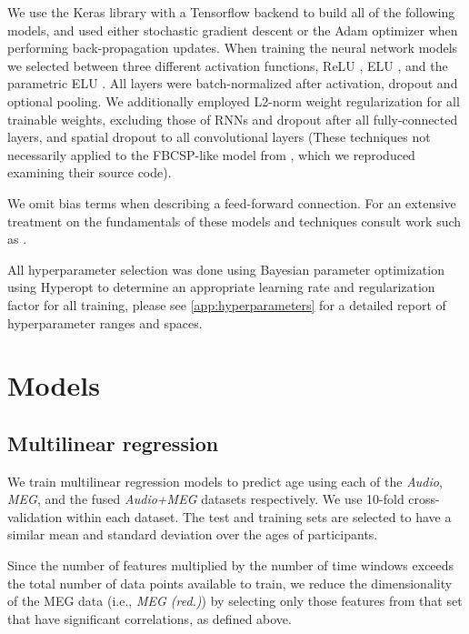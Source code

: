 \documentclass[utf8]{frontiersSCNS} %
\begin{document}
We use the Keras library \cite{} with a Tensorflow \cite{} backend to build all of the following models, and used either stochastic gradient descent or the Adam optimizer \cite{} when performing back-propagation updates. When training the neural network models we selected between three different activation functions, ReLU \cite{}, ELU \cite{}, and the parametric ELU \cite{}. All layers were batch-normalized \cite{Szegedy2015} after activation, dropout and optional pooling. We additionally employed L2-norm weight regularization for all trainable weights, excluding those of RNNs and dropout \cite{} after all fully-connected layers, and spatial dropout \cite{} to all convolutional layers (These techniques not necessarily applied to the FBCSP-like model from \cite{Schirrmeister2017}, which we reproduced examining their source code).

We omit bias terms when describing a feed-forward connection. For an extensive treatment on the fundamentals of these models and techniques consult work such as \cite{GoodfellowTextbook}.

All hyperparameter selection was done using Bayesian parameter optimization using Hyperopt \cite{Bergstra2013} to determine an appropriate learning rate and regularization factor for all training, please see \ref{app:hyperparameters} for a detailed report of hyperparameter ranges and spaces.

\section{Models}

\subsection{Multilinear regression}

We train multilinear regression models to predict age using each of the \textit{Audio}, \textit{MEG}, and the fused \textit{Audio+MEG} datasets respectively. We use 10-fold cross-validation within each dataset. The test and training sets are selected to have a similar mean and standard deviation over the ages of participants. 

Since the number of features multiplied by the number of time windows exceeds the total number of data points available to train, we reduce the dimensionality of the MEG data (i.e., {\em MEG (red.)}) by selecting only those features from that set that have significant correlations, as defined above.
\end{document}
